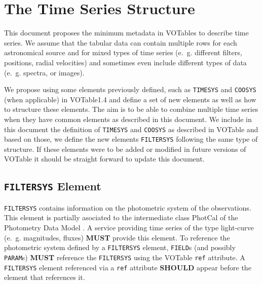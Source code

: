 \documentclass[11pt,a4paper]{ivoa}
\let\fg=\color
\def\attr#1{{\tt{\fg{DarkRed}#1}}}
\def\elem#1{{\tt{\fg{DarkRed}#1}}}
\begin{document}

\section{The Time Series Structure}
\label{elem:TIMESERIES}
This document proposes the minimum metadata in VOTables to describe time series. We assume that the tabular data can contain multiple rows for each astronomical source and for mixed types of time series (e.~g. different filters, positions, radial velocities) and sometimes even include different types of data (e.~g. spectra, or images). 

We propose using some elements previously defined, such as \elem{TIMESYS} and \elem{COOSYS} (when applicable) in VOTable1.4 \cite{VOTable1.4} and define a set of new elements as well as how to structure these elements. The aim is to be able to combine multiple time series when they have common elements as described in this document. We include in this document the definition of \elem{TIMESYS} and \elem{COOSYS} as described in VOTable and based on those, we define the new elements \elem{FILTERSYS} following the same type of structure. If these elements were to be added or modified in future versions of VOTable it should be straight forward to update this document. 

%
%

\subsection{\elem{FILTERSYS} Element}
\elem{FILTERSYS} contains information on the photometric system of the observations. This element is partially asociated to the intermediate class PhotCal of the Photometry Data Model \cite{PhotometryDM}. A service providing time series of the type light-curve (e.~g. magnitudes, fluxes) \textbf{MUST} provide this element. To reference the photometric system defined by a \elem{FILTERSYS} element, \elem{FIELD}s (and possibly \elem{PARAM}s) \textbf{MUST} reference the \elem{FILTERSYS} using the VOTable \attr{ref} attribute. A \elem{FILTERSYS} element referenced via a \attr{ref} attribute \textbf{SHOULD} appear before the element that references it. 
\end{document}

